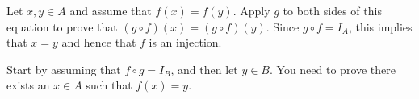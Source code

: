 \begin{list}{\bf{\ref{exer:compequalidentity}.}}
\item \begin{list}{\bf{(a)}}
\item Let $x, y \in A$ and assume that 
$f ( x ) = f ( y )$.  Apply $g$ to both sides of this equation to prove that 
$( g \circ f ) ( x ) = ( g \circ f ) ( y )$.
Since $g \circ f = I_A $, this implies that $x = y$ and hence that $f$ is an injection.
\end{list}
\end{list}

\begin{list}{}
\item \begin{list}{\bf{(b)}}
\item Start by assuming that $f \circ g = I_B $, and then let $ y \in B$.  You need to prove there exists an $x \in A$ such that $f ( x ) = y$.
\end{list}
\end{list}







